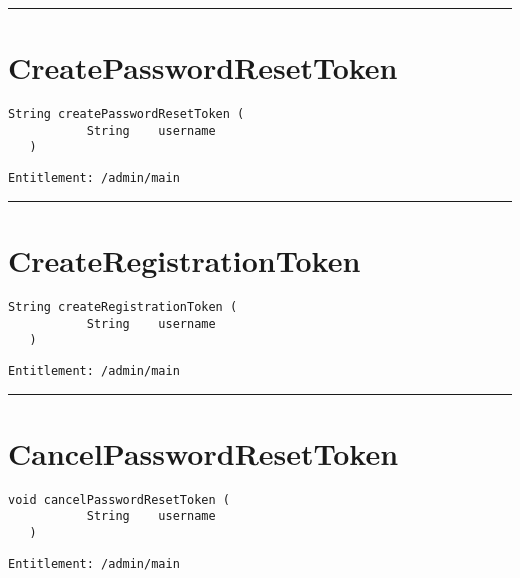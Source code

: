 \rule{12cm}{2pt}
\section{CreatePasswordResetToken}
\label{Api:CreatePasswordResetToken}
\begin{lstlisting}[style=nonumbers]
   String createPasswordResetToken (
           String    username
   )
\end{lstlisting}
\begin{Verbatim}[formatcom=\color{Maroon}]
  Entitlement: /admin/main
\end{Verbatim}



\rule{12cm}{2pt}
\section{CreateRegistrationToken}
\label{Api:CreateRegistrationToken}
\begin{lstlisting}[style=nonumbers]
   String createRegistrationToken (
           String    username
   )
\end{lstlisting}
\begin{Verbatim}[formatcom=\color{Maroon}]
  Entitlement: /admin/main
\end{Verbatim}



\rule{12cm}{2pt}
\section{CancelPasswordResetToken}
\label{Api:CancelPasswordResetToken}
\begin{lstlisting}[style=nonumbers]
   void cancelPasswordResetToken (
           String    username
   )
\end{lstlisting}
\begin{Verbatim}[formatcom=\color{Maroon}]
  Entitlement: /admin/main
\end{Verbatim}



